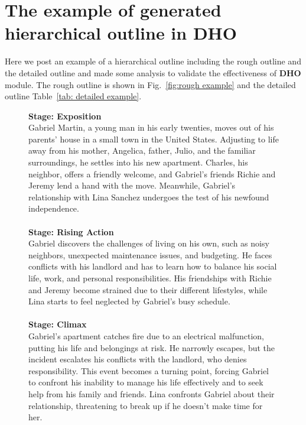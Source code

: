 \section{The example of generated hierarchical outline in DHO}
\label{sup:dho example}
Here we post an example of a hierarchical outline including the rough outline and the detailed outline and made some analysis to validate the effectiveness of \textbf{DHO} module. The rough outline is shown in Fig.~\ref{fig:rough example} and the detailed outline Table~\ref{tab: detailed example}. 
\begin{figure}[htbp]
\centering
\begin{tcolorbox}
\textbf{Stage: Exposition}\\
Gabriel Martin, a young man in his early twenties, moves out of his parents' house in a small town in the United States. Adjusting to life away from his mother, Angelica, father, Julio, and the familiar surroundings, he settles into his new apartment. Charles, his neighbor, offers a friendly welcome, and Gabriel's friends Richie and Jeremy lend a hand with the move. Meanwhile, Gabriel's relationship with Lina Sanchez undergoes the test of his newfound independence.\\
\\
\textbf{Stage: Rising Action}\\
Gabriel discovers the challenges of living on his own, such as noisy neighbors, unexpected maintenance issues, and budgeting. He faces conflicts with his landlord and has to learn how to balance his social life, work, and personal responsibilities. His friendships with Richie and Jeremy become strained due to their different lifestyles, while Lina starts to feel neglected by Gabriel's busy schedule.\\
\\
\textbf{Stage: Climax}\\
Gabriel's apartment catches fire due to an electrical malfunction, putting his life and belongings at risk. He narrowly escapes, but the incident escalates his conflicts with the landlord, who denies responsibility. This event becomes a turning point, forcing Gabriel to confront his inability to manage his life effectively and to seek help from his family and friends. Lina confronts Gabriel about their relationship, threatening to break up if he doesn't make time for her.\\
\\

\end{tcolorbox}
\end{figure}
